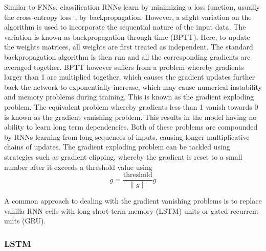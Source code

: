 Similar to FNNs, classification RNNs learn by minimizing a loss function,
usually the cross-entropy loss~\cite{shore1980axiomatic}, by backpropagation.
However, a slight variation on the algorithm is used to incorporate the
sequential nature of the input data. The variation is known as backpropagation
through time (BPTT). Here, to update the weights matrices, all weights
are first treated as independent. The standard backpropagation algorithm is then
run and all the corresponding gradients are averaged together. BPTT however
suffers from a problem whereby gradients larger than 1 are multiplied together,
which causes the gradient updates further back the network to exponentially
increase, which may cause numerical instability and memory problems during
training. This is known as the gradient exploding problem. The equivalent
problem whereby gradients less than 1 vanish towards 0 is known as the gradient
vanishing problem. This results in the model having no ability to learn long
term dependencies. Both of these problems are compounded by RNNs learning from
long sequences of inputs, causing longer multiplicative chains of updates. The
gradient exploding problem can be tackled using strategies such as gradient
clipping, whereby the gradient is reset to a small number after it exceeds a
threshold value using 
\begin{equation} 
  g = \frac{\text{threshold}}{\|g\|}g
\end{equation}

A common approach to dealing with the gradient vanishing problems is to replace
vanilla RNN cells with long short-term memory (LSTM) units or gated recurrent
units (GRU).

\subsubsection{LSTM}

